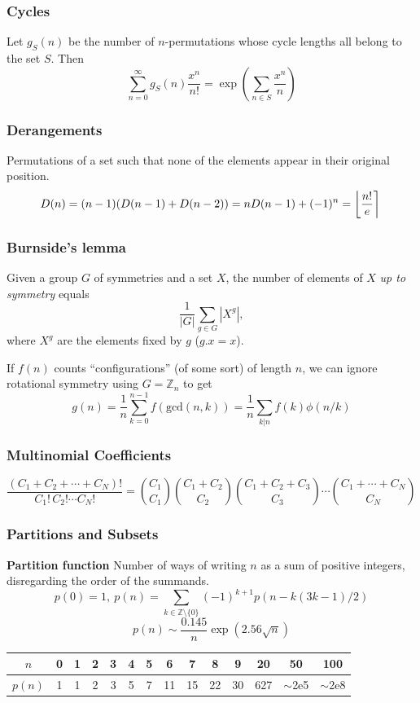 \subsubsection{Cycles}
Let $g_S(n)$ be the number of $n$-permutations whose cycle lengths all belong to the set $S$. Then
$$\sum_{n=0} ^\infty g_S(n) \frac{x^n}{n!} = \exp\left(\sum_{n\in S} \frac{x^n} {n} \right)$$

\subsubsection{Derangements}
Permutations of a set such that none of the elements appear in their original position.
\[ \mkern-2mu D(n) = (n-1)(D(n-1)+D(n-2)) = n D(n-1)+(-1)^n = \left\lfloor\frac{n!}{e}\right\rceil \]

\subsubsection{Burnside's lemma}
Given a group $G$ of symmetries and a set $X$, the number of elements of $X$ \emph{up to symmetry} equals
\[ {\frac {1}{|G|}}\sum _{{g\in G}}|X^{g}|, \]
where $X^{g}$ are the elements fixed by $g$ ($g.x = x$).

If $f(n)$ counts ``configurations'' (of some sort) of length $n$, we can ignore rotational symmetry using $G = \mathbb Z_n$ to get
\[ g(n) = \frac 1 n \sum_{k=0}^{n-1}{f(\text{gcd}(n, k))} = \frac 1 n \sum_{k|n}{f(k)\phi(n/k)} \]

\subsubsection{Multinomial Coefficients}
\[
\frac{(C_1 + C_2 + \cdots + C_N)!}{C_1! \, C_2! \cdots C_N!}
=
\binom{C_1}{C_1}
\binom{C_1 + C_2}{C_2}
\binom{C_1 + C_2 + C_3}{C_3}
\cdots
\binom{C_1 + \cdots + C_N}{C_N}
\]

\subsubsection{Partitions and Subsets}
\textbf{Partition function}
Number of ways of writing $n$ as a sum of positive integers, disregarding the order of the summands.
\[ p(0) = 1,\ p(n) = \sum_{k \in \mathbb Z \setminus \{0\}}{(-1)^{k+1} p(n - k(3k-1) / 2)} \]
\[ p(n) \sim \frac{0.145}{n} \exp(2.56 \sqrt{n}) \]

\begin{center}
\begin{tabular}{c|c@{\ }c@{\ }c@{\ }c@{\ }c@{\ }c@{\ }c@{\ }c@{\ }c@{\ }c@{\ }c@{\ }c@{\ }c}
  $n$    & 0 & 1 & 2 & 3 & 4 & 5 & 6  & 7  & 8  & 9  & 20  & 50  & 100 \\ \hline
  $p(n)$ & 1 & 1 & 2 & 3 & 5 & 7 & 11 & 15 & 22 & 30 & 627 & $\mathtt{\sim}$2e5 & $\mathtt{\sim}$2e8 \\
\end{tabular}
\end{center}

